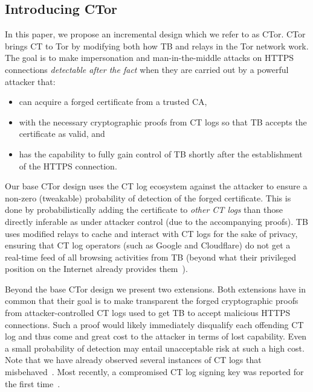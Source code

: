 \subsection{Introducing CTor}
In this paper, we propose an incremental design which we refer to as CTor. CTor
brings CT to Tor by modifying both how TB and relays in the Tor network work.
The goal is to make impersonation and man-in-the-middle attacks on HTTPS
connections \emph{detectable after the fact} when they are carried out by a
powerful attacker that:
\begin{itemize}
	\item can acquire a forged certificate from a trusted CA,
	\item with the necessary cryptographic proofs from CT logs so that TB
	accepts the certificate as valid, and
	\item has the capability to fully gain control of TB shortly after the
	establishment of the HTTPS connection.
\end{itemize}

Our base CTor design uses the CT log ecosystem against the attacker to ensure a
non-zero (tweakable) probability of detection of the forged certificate. This is
done by probabilistically adding the certificate to \emph{other CT logs} than
those directly inferable as under attacker control (due to the accompanying
proofs). TB uses modified relays to cache and interact with CT logs for the sake
of privacy, ensuring that CT log operators (such as Google and Cloudflare) do
not get a real-time feed of all browsing activities from TB (beyond what their
privileged position on the Internet already provides them~\cite{TorDNS}). 

Beyond the base CTor design we present two extensions. Both extensions have in
common that their goal is to make transparent the forged cryptographic proofs
from attacker-controlled CT logs used to get TB to accept malicious HTTPS
connections. Such a proof would likely immediately disqualify each offending CT
log and thus come and great cost to the attacker in terms of lost capability.
Even a small probability of detection may entail unacceptable risk at such a
high cost. Note that we have already observed several instances of CT logs that
misbehaved~\cite{izenpe-disqualified,venafi-disqualified,gdca1-omission}. Most
recently, a compromised CT log signing key was reported for the first
time~\cite{digicert-log-compromised}. 

